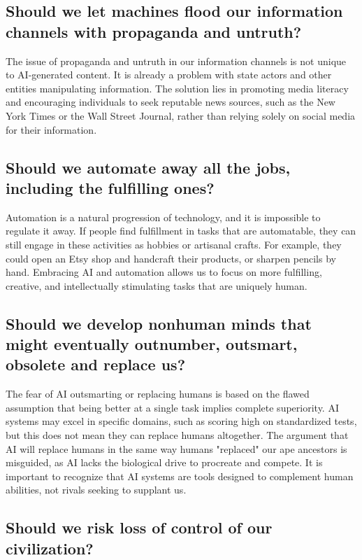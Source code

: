 \subsection{Should we let machines flood our information channels with propaganda and untruth?}

The issue of propaganda and untruth in our information channels is not unique to AI-generated content. It is already a problem with state actors and other entities manipulating information. The solution lies in promoting media literacy and encouraging individuals to seek reputable news sources, such as the New York Times or the Wall Street Journal, rather than relying solely on social media for their information.

\subsection{Should we automate away all the jobs, including the fulfilling ones?}

Automation is a natural progression of technology, and it is impossible to regulate it away. If people find fulfillment in tasks that are automatable, they can still engage in these activities as hobbies or artisanal crafts. For example, they could open an Etsy shop and handcraft their products, or sharpen pencils by hand. Embracing AI and automation allows us to focus on more fulfilling, creative, and intellectually stimulating tasks that are uniquely human.

\subsection{Should we develop nonhuman minds that might eventually outnumber, outsmart, obsolete and replace us?}

The fear of AI outsmarting or replacing humans is based on the flawed assumption that being better at a single task implies complete superiority. AI systems may excel in specific domains, such as scoring high on standardized tests, but this does not mean they can replace humans altogether. The argument that AI will replace humans in the same way humans "replaced" our ape ancestors is misguided, as AI lacks the biological drive to procreate and compete. It is important to recognize that AI systems are tools designed to complement human abilities, not rivals seeking to supplant us.

\subsection{Should we risk loss of control of our civilization?}

